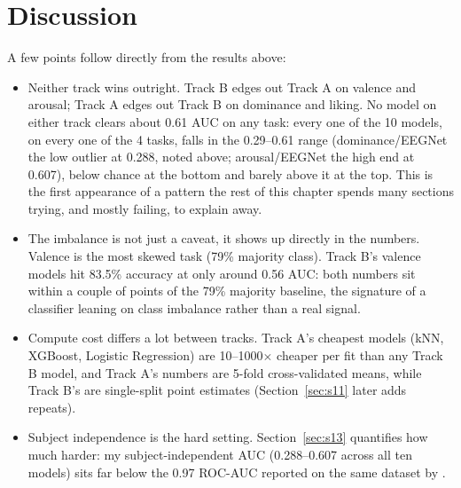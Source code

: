 \documentclass[11pt]{report}
\begin{document}
\section{Discussion}
\label{sec:s8}
A few points follow directly from the results above:
\begin{itemize}
  \item Neither track wins outright. Track B edges out Track A on valence
        and arousal; Track A edges out Track B on dominance and liking. No
        model on either track clears about 0.61 AUC on any task: every one
        of the 10 models, on every one of the 4 tasks, falls in the
        0.29--0.61 range (dominance/EEGNet the low outlier at 0.288, noted
        above; arousal/EEGNet the high end at 0.607), below chance at the
        bottom and barely above it at the top. This is the first
        appearance of a pattern the rest of this chapter spends many
        sections trying, and mostly failing, to explain away.
  \item The imbalance is not just a caveat, it shows up directly in the
        numbers. Valence is the most skewed task (79\% majority class).
        Track B's valence models hit 83.5\% accuracy at only around 0.56
        AUC: both numbers sit within a couple of points of the 79\% majority
        baseline, the signature of a classifier leaning on class imbalance
        rather than a real signal.
  \item Compute cost differs a lot between tracks. Track A's cheapest models
        (kNN, XGBoost, Logistic Regression) are 10--1000$\times$ cheaper per
        fit than any Track B model, and Track A's numbers are 5-fold
        cross-validated means, while Track B's are single-split point
        estimates (Section~\ref{sec:s11} later adds repeats).
  \item Subject independence is the hard setting. Section~\ref{sec:s13}
        quantifies how much harder: my subject-independent AUC (0.288--0.607
        across all ten models) sits far below the 0.97 ROC-AUC reported on
        the same dataset by \citet{hasan2025methodsx}.
\end{itemize}
\end{document}

